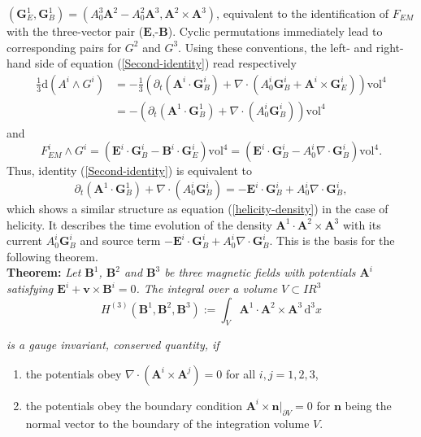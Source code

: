 \documentclass[10pt]{iopart}
\def \d{\mbox{d}}
\def \reals{I\!\!R}
\def \dxxx{\,\d^{3}\!x}
\def \text{\mbox}
\def \Eq{equation }
\def \p{{\partial}}
\newcommand{\vol}[1]{{\text{vol}^{#1}}}
\def \bA{{\mathbf{A}}}
\def \bB{{\mathbf{B}}}
\def \bE{{\mathbf{E}}}
\def \bG{{\mathbf{G}}}
\def \bv{{\mathbf{v}}}
\def \bn{{\mathbf{n}}}
\begin{document}
$(\bG_E^1,\bG_B^1) = (A_0^3\bA^2-A_0^2\bA^3, \bA^2\times\bA^3)$,
equivalent to the identification of  $F_{EM}$ with 
the three-vector pair ($\bE$,-$\bB$).
Cyclic permutations immediately lead to corresponding 
pairs for $G^2$ and $G^3$.
Using these conventions, the left- and right-hand side of
\Eq (\ref{Second-identity}) read respectively 
\begin{eqnarray}
   \frac{1}{3}\d(A^i\wedge G^i)
         &= -\frac{1}{3}\left(\p_t(\bA^i\cdot\bG_B^i)
                     +\nabla\cdot(A_0^i\bG_B^i+\bA^i\times\bG_E^i)\right)
                                        \vol{4}\nonumber\\
      &= -\left(\p_t(\bA^1\cdot\bG_B^1)
                      +  \nabla\cdot(A_0^i\bG_B^i)\right)\vol{4}
                    \nonumber
\end{eqnarray}
and
\[  F_{EM}^i \wedge G^i = (\bE^i\cdot \bG_B^i-\bB^i\cdot\bG_E^i) \vol{4}    
               = (\bE^i\cdot \bG_B^i-A_0^i\nabla\cdot\bG_B^i)\vol{4}.
\]
Thus, identity (\ref{Second-identity}) is equivalent to
\begin{equation}
   \p_t(\bA^1\cdot\bG_B^1)+\nabla\cdot(A_0^i\bG_B^i)
    = -\bE^i\cdot \bG_B^i+A_0^i\nabla\cdot\bG_B^i,
    \label{third-order-density-evolution}
\end{equation}
which shows a similar structure as \Eq (\ref{helicity-density})
in the case of helicity.
It describes the time evolution of the density 
$\bA^1\cdot\bA^2\times\bA^3$
with its current $A_0^i\bG_B^i$
and source term $-\bE^i\cdot \bG_B^i+A_0^i\nabla\cdot\bG_B^i$. This is
the basis for the following theorem.\\

\noindent
{\bf Theorem: }{\em 
Let $\bB^1$, $\bB^2$ and $\bB^3$ 
be three magnetic fields with potentials
$\bA^i$ satisfying $\bE^i+\bv \times\bB^i=0$. The integral over 
a volume $V\subset\reals^3$}
\begin{equation}
   H^{(3)}(\bB^1,\bB^2,\bB^3) := \int_{V} \bA^1\cdot\bA^2\times\bA^3\dxxx
   \label{H-3-continuous-integral}
\end{equation}
{\em
is a gauge invariant, conserved quantity, if
\begin{enumerate}
\item the potentials obey $\nabla\cdot(\bA^i\times\bA^j)=0$ for all
  $i,j=1,2,3$, \label{H-3-condition-1}
\item the potentials obey the boundary condition 
  $\bA^i\times\bn|_{\p V}=0$ for $\bn$ 
  being the normal vector to the boundary of the integration volume $V$.
  \label{H-3-condition-2}
\end{enumerate}
}
\end{document}
